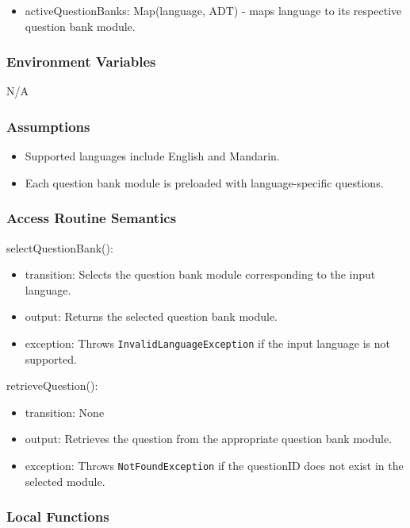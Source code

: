 \documentclass[12pt, titlepage]{article}
\begin{document}
\begin{itemize}
  \item activeQuestionBanks: Map(language, ADT) - maps language to its respective question bank module.
\end{itemize}

\subsubsection{Environment Variables}

N/A

\subsubsection{Assumptions}

\begin{itemize}
  \item Supported languages include English and Mandarin.
  \item Each question bank module is preloaded with language-specific questions.
\end{itemize}

\subsubsection{Access Routine Semantics}

\noindent selectQuestionBank():
\begin{itemize}
\item transition: Selects the question bank module corresponding to the input language.
\item output: Returns the selected question bank module.
\item exception: Throws \texttt{InvalidLanguageException} if the input language is not supported.
\end{itemize}

\noindent retrieveQuestion():
\begin{itemize}
\item transition: None
\item output: Retrieves the question from the appropriate question bank module.
\item exception: Throws \texttt{NotFoundException} if the questionID does not exist in the selected module.
\end{itemize}

\subsubsection{Local Functions}
\end{document}

